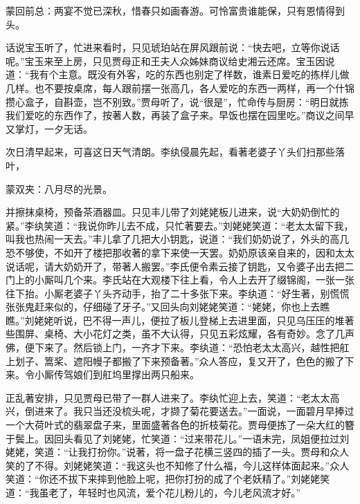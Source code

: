 

\begin{parag}
    \begin{note}蒙回前总：两宴不觉已深秋，惜春只如画春游。可怜富贵谁能保，只有恩情得到头。\end{note}
\end{parag}


\begin{parag}
    话说宝玉听了，忙进来看时，只见琥珀站在屏风跟前说：“快去吧，立等你说话呢。”宝玉来至上房，只见贾母正和王夫人众姊妹商议给史湘云还席。宝玉因说道：“我有个主意。既没有外客，吃的东西也别定了样数，谁素日爱吃的拣样儿做几样。也不要按桌席，每人跟前摆一张高几，各人爱吃的东西一两样，再一个什锦攒心盒子，自斟壶，岂不别致。”贾母听了，说“很是”，忙命传与厨房：“明日就拣我们爱吃的东西作了，按著人数，再装了盒子来。早饭也摆在园里吃。”商议之间早又掌灯，一夕无话。
\end{parag}


\begin{parag}
    次日清早起来，可喜这日天气清朗。李纨侵晨先起，看著老婆子丫头们扫那些落叶，\begin{note}蒙双夹：八月尽的光景。\end{note}并擦抹桌椅，预备茶酒器皿。只见丰儿带了刘姥姥板儿进来，说“大奶奶倒忙的紧。”李纨笑道：“我说你昨儿去不成，只忙著要去。”刘姥姥笑道：“老太太留下我，叫我也热闹一天去。”丰儿拿了几把大小钥匙，说道：“我们奶奶说了，外头的高几恐不够使，不如开了楼把那收著的拿下来使一天罢。奶奶原该亲自来的，因和太太说话呢，请大奶奶开了，带著人搬罢。”李氏便令素云接了钥匙，又令婆子出去把二门上的小厮叫几个来。李氏站在大观楼下往上看，令人上去开了缀锦阁，一张一张往下抬。小厮老婆子丫头齐动手，抬了二十多张下来。李纨道：“好生著，别慌慌张张鬼赶来似的，仔细碰了牙子。”又回头向刘姥姥笑道：“姥姥，你也上去瞧瞧。”刘姥姥听说，巴不得一声儿，便拉了板儿登梯上去进里面，只见乌压压的堆著些围屏、桌椅、大小花灯之类，虽不大认得，只见五彩炫耀，各有奇妙。念了几声佛，便下来了。然后锁上门，一齐才下来。李纨道：“恐怕老太太高兴，越性把舡上划子、篙桨、遮阳幔子都搬了下来预备著。”众人答应，复又开了，色色的搬了下来。令小厮传驾娘们到舡坞里撑出两只船来。
\end{parag}


\begin{parag}
    正乱著安排，只见贾母已带了一群人进来了。李纨忙迎上去，笑道：“老太太高兴，倒进来了。我只当还没梳头呢，才撷了菊花要送去。”一面说，一面碧月早捧过一个大荷叶式的翡翠盘子来，里面盛著各色的折枝菊花。贾母便拣了一朵大红的簪于鬓上。因回头看见了刘姥姥，忙笑道：“过来带花儿。”一语未完，凤姐便拉过刘姥姥，笑道：“让我打扮你。”说著，将一盘子花横三竖四的插了一头。贾母和众人笑的了不得。刘姥姥笑道：“我这头也不知修了什么福，今儿这样体面起来。”众人笑道：“你还不拔下来摔到他脸上呢，把你打扮的成了个老妖精了。”刘姥姥笑道：“我虽老了，年轻时也风流，爱个花儿粉儿的，今儿老风流才好。”
\end{parag}


